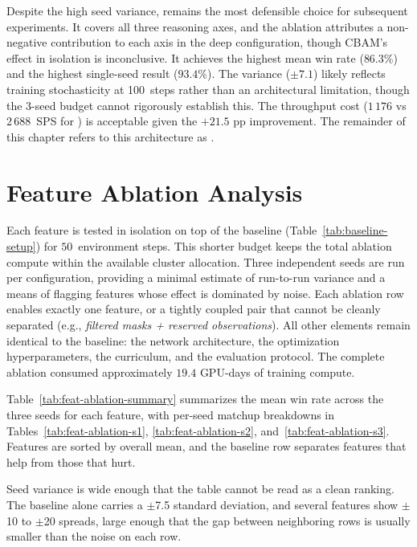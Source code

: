 Despite the high seed variance,  remains the most defensible choice for subsequent experiments. It covers all three reasoning axes, and the ablation attributes a non-negative contribution to each axis in the deep configuration, though CBAM's effect in isolation is inconclusive. It achieves the highest mean win rate ($86.3$\%) and the highest single-seed result ($93.4$\%). The variance ($\pm7.1$) likely reflects training stochasticity at 100\, steps rather than an architectural limitation, though the 3-seed budget cannot rigorously establish this. The throughput cost ($1\,176$ vs $2\,688$~SPS for ) is acceptable given the $+21.5$ pp improvement. The remainder of this chapter refers to this architecture as .


\section{Feature Ablation Analysis}
\label{sec:feat-ablation}

Each feature is tested in isolation on top of the  baseline (Table~\ref{tab:baseline-setup}) for $50$\, environment steps. This shorter budget keeps the total ablation compute within the available cluster allocation. Three independent seeds are run per configuration, providing a minimal estimate of run-to-run variance and a means of flagging features whose effect is dominated by noise. Each ablation row enables exactly one feature, or a tightly coupled pair that cannot be cleanly separated (e.g., \emph{filtered masks + reserved observations}). All other elements remain identical to the baseline: the network architecture, the optimization hyperparameters, the curriculum, and the evaluation protocol. The complete ablation consumed approximately $19.4$ GPU-days of training compute. 

\medskip

Table~\ref{tab:feat-ablation-summary} summarizes the mean win rate across the three seeds for each feature, with per-seed matchup breakdowns in Tables~\ref{tab:feat-ablation-s1}, \ref{tab:feat-ablation-s2}, and~\ref{tab:feat-ablation-s3}. Features are sorted by overall mean, and the baseline row separates features that help from those that hurt.

\medskip

Seed variance is wide enough that the table cannot be read as a clean ranking. The baseline alone carries a $\pm$7.5 standard deviation, and several features show $\pm$10 to $\pm$20 spreads, large enough that the gap between neighboring rows is usually smaller than the noise on each row.

